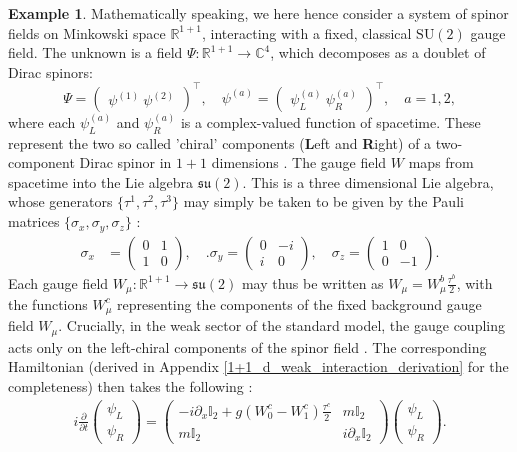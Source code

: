 \documentclass[reqno,12pt,letterpaper]{amsart}
\numberwithin{equation}{section}
\newcommand{\1}{\mathds{1}}
\theoremstyle{definition}
\newtheorem{Ex}[Th]{Example}
\begin{document}
\begin{Ex}
	
	Mathematically speaking, we here hence consider a system of spinor fields on Minkowski space \(\mathbb{R}^{1+1}\), interacting with a fixed, classical \(\mathrm{SU}(2)\) gauge field. The unknown is a field \(\Psi: \mathbb{R}^{1+1} \to \mathbb{C}^4\), which decomposes as a doublet of Dirac spinors:
	\[
	\Psi = \begin{pmatrix}
		\psi^{(1)} \
		\psi^{(2)}
	\end{pmatrix}^\top, \quad
	\psi^{(a)} = \begin{pmatrix}
		\psi_L^{(a)} \
		\psi_R^{(a)}
	\end{pmatrix}^\top, \quad a = 1, 2,
	\]
	where each \(\psi_L^{(a)}\) and \(\psi_R^{(a)}\) is a complex-valued function of spacetime. These represent the two so called 'chiral' components (\textbf{L}eft and \textbf{R}ight) of a two-component Dirac spinor in \(1+1\) dimensions \cite{hamilton2017mathematical}.  
	The gauge field $W $ maps from spacetime into the Lie algebra $\mathfrak{su}(2)$.
	This is a three dimensional Lie algebra, whose generators $\{\tau^1,\tau^2, \tau^3 \}$ may simply be taken to be given by the Pauli matrices $\{\sigma_x, \sigma_y, \sigma_z \}$ :
		\begin{align}
		\sigma_x&= \begin{pmatrix}
			0 & 1 \\
			1 & 0
		\end{pmatrix}, \quad
	.
		\sigma_y = \begin{pmatrix}
			0 & -i \\
			i & 0
		\end{pmatrix}, \quad
		\sigma_z = \begin{pmatrix}
			1 & 0 \\
			0 & -1
		\end{pmatrix}.
	\end{align}
	Each gauge field  $W_\mu:\mathds{R}^{1+1} \rightarrow \mathfrak{su}(2) $	may thus be written as \(W_\mu = W_\mu^b \frac{\tau^b}{2}\), with the functions \(W_\mu^c\) representing the components of the fixed background gauge field $W_\mu$.
	Crucially, in the weak sector of the standard model, the gauge coupling acts only on the left-chiral components of the spinor field \cite{peskin1995introduction}. The corresponding Hamiltonian (derived in Appendix \ref{1+1_d_weak_interaction_derivation} for the completeness) then takes the following :	
	\begin{align}
		i \frac{\partial}{\partial t} 
		\begin{pmatrix}
			\psi_L \\
			\psi_R
		\end{pmatrix}
		=
		\begin{pmatrix}
			- i \partial_x  \mathbb{I}_2 + g (W_0^c - W_1^c)  \frac{\tau^c}{2}
			& m \mathbb{I}_2 \\
			m \mathbb{I}_2 & i \partial_x  \mathbb{I}_2
		\end{pmatrix}
		\begin{pmatrix}
			\psi_L \\
			\psi_R
		\end{pmatrix}.
	\end{align}
	

\end{Ex}
\end{document}
